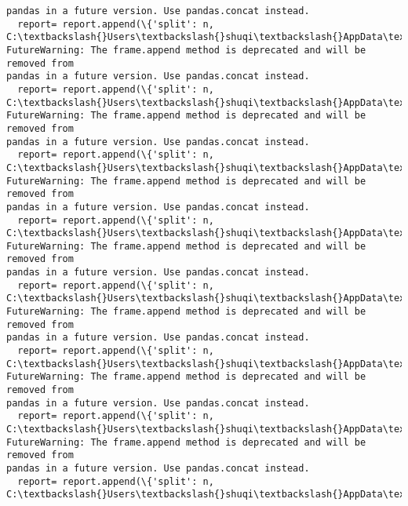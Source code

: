\documentclass[11pt]{article}
\begin{document}
\begin{Verbatim}[commandchars=\\\{\}]
pandas in a future version. Use pandas.concat instead.
  report= report.append(\{'split': n,
C:\textbackslash{}Users\textbackslash{}shuqi\textbackslash{}AppData\textbackslash{}Local\textbackslash{}Temp\textbackslash{}ipykernel\_10424\textbackslash{}1313451084.py:19:
FutureWarning: The frame.append method is deprecated and will be removed from
pandas in a future version. Use pandas.concat instead.
  report= report.append(\{'split': n,
C:\textbackslash{}Users\textbackslash{}shuqi\textbackslash{}AppData\textbackslash{}Local\textbackslash{}Temp\textbackslash{}ipykernel\_10424\textbackslash{}1313451084.py:19:
FutureWarning: The frame.append method is deprecated and will be removed from
pandas in a future version. Use pandas.concat instead.
  report= report.append(\{'split': n,
C:\textbackslash{}Users\textbackslash{}shuqi\textbackslash{}AppData\textbackslash{}Local\textbackslash{}Temp\textbackslash{}ipykernel\_10424\textbackslash{}1313451084.py:19:
FutureWarning: The frame.append method is deprecated and will be removed from
pandas in a future version. Use pandas.concat instead.
  report= report.append(\{'split': n,
C:\textbackslash{}Users\textbackslash{}shuqi\textbackslash{}AppData\textbackslash{}Local\textbackslash{}Temp\textbackslash{}ipykernel\_10424\textbackslash{}1313451084.py:19:
FutureWarning: The frame.append method is deprecated and will be removed from
pandas in a future version. Use pandas.concat instead.
  report= report.append(\{'split': n,
C:\textbackslash{}Users\textbackslash{}shuqi\textbackslash{}AppData\textbackslash{}Local\textbackslash{}Temp\textbackslash{}ipykernel\_10424\textbackslash{}1313451084.py:19:
FutureWarning: The frame.append method is deprecated and will be removed from
pandas in a future version. Use pandas.concat instead.
  report= report.append(\{'split': n,
C:\textbackslash{}Users\textbackslash{}shuqi\textbackslash{}AppData\textbackslash{}Local\textbackslash{}Temp\textbackslash{}ipykernel\_10424\textbackslash{}1313451084.py:19:
FutureWarning: The frame.append method is deprecated and will be removed from
pandas in a future version. Use pandas.concat instead.
  report= report.append(\{'split': n,
C:\textbackslash{}Users\textbackslash{}shuqi\textbackslash{}AppData\textbackslash{}Local\textbackslash{}Temp\textbackslash{}ipykernel\_10424\textbackslash{}1313451084.py:19:
FutureWarning: The frame.append method is deprecated and will be removed from
pandas in a future version. Use pandas.concat instead.
  report= report.append(\{'split': n,
C:\textbackslash{}Users\textbackslash{}shuqi\textbackslash{}AppData\textbackslash{}Local\textbackslash{}Temp\textbackslash{}ipykernel\_10424\textbackslash{}1313451084.py:19:

\end{Verbatim}
\end{document}

